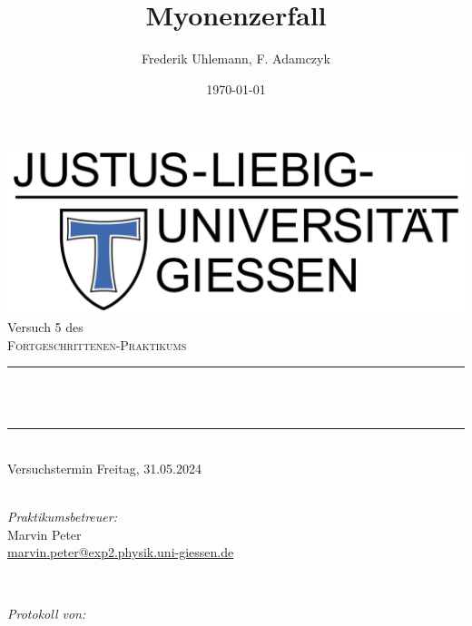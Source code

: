 \documentclass[12pt,a4paper,ngerman]{report}
\title{Myonenzerfall}			%
\author{Frederik Uhlemann, F. Adamczyk}
\date{\today}
\makeatletter
\let\thetitle\@title
\makeatother
\begin{document}
		
	
	\begin{titlepage}
		\centering
		\vspace*{0.5 cm}
		\includegraphics[width = 0.6 \textwidth]{JLU_Giessen-Logo}	%
		\\[2.0 cm]
		Versuch 5 des\\
		\textsc{\Large  Fortgeschrittenen-Praktikums}\\ [0.3 cm]				%
		\rule{\linewidth}{0.2 mm} \\[0.4 cm]
		{ \huge \bfseries \thetitle}\\%
		\rule{\linewidth}{0.2 mm}\\
		Versuchstermin Freitag, 31.05.2024 \\
		~ \\
		[2.0 cm]
		
		
		\begin{minipage}{0.49\textwidth}
			\begin{flushleft}
				 \emph{Praktikumsbetreuer:}\\
				 Marvin Peter\\
				 \small{\href{mailto:marvin.peter@exp2.physik.uni-giessen.de}{marvin.peter@exp2.physik.uni-giessen.de}}
			\end{flushleft}
		\end{minipage}~
		\begin{minipage}{0.49\textwidth}
			\begin{flushright}
				\emph{Protokoll von:} \\
				

\end{flushright}
\end{minipage}
\end{titlepage}
\end{document}
